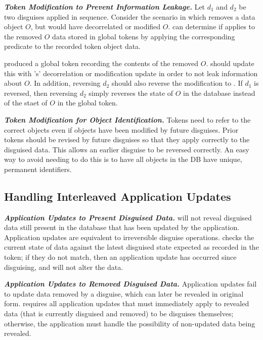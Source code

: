 \vspace{6pt}\noindent\textbf{\emph{Token Modification to Prevent Information Leakage.}}
Let $d_1$ and $d_2$ be two disguises applied in sequence.
Consider the scenario in which  removes a data object $O$, but  would have decorrelated
or modified $O$.
\sys can determine if  applies to the removed $O$ data stored in global tokens by applying
the corresponding  predicate to the recorded token object data.

 produced a global token  recording the contents of the removed $O$.
\sys should update this  with 's' decorrelation or modification update in order
to not leak information about $O$.
In addition, reversing $d_2$ should also reverse the modification to . If $d_1$ is
reversed, then reversing $d_2$ simply reverses the state of $O$ in the database instead of the staet
of $O$ in the global token.

\vspace{6pt}\noindent\textbf{\emph{Token Modification for Object Identification.}}
Tokens need to refer to the correct objects even if objects have been modified by future disguises.
Prior tokens should be revised by future disguises so that they apply correctly to the disguised
data.
This allows an earlier disguise to be reversed correctly.
An easy way to avoid needing to do this is to have all objects in the DB have unique, permanent
identifiers.

\subsection{Handling Interleaved Application Updates}
\noindent\textbf{\emph{Application Updates to Present Disguised Data.}}
\sys will not reveal disguised data still present in the database that has been updated by the
application. Application updates are equivalent to irreversible disguise operations.
\sys checks the current state of data against the latest disguised state
expected as recorded in the token; if they do not match, then an application update has occurred
since disguising, and \sys will not alter the data.

\vspace{6pt}\noindent\textbf{\emph{Application Updates to Removed Disguised Data.}}
Application updates fail to update data removed by a disguise, which can later be revealed in
original form.
\sys requires all application updates that must immediately apply to revealed data (that is
currently disguised and removed) to be disguises themselves; otherwise, the application must handle
the possibility of non-updated data being revealed.

